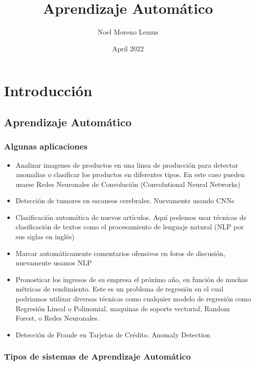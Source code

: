\documentclass[10pt,a4paper]{book}
\title{Aprendizaje Autom\'atico}
\author{Noel Moreno Lemus}
\date{April 2022 }
\begin{document}
\maketitle
  
\tableofcontents

\part{Introducci\'on}

\chapter{Aprendizaje Autom\'atico}

\section{Algunas aplicaciones}
\begin{itemize}
\item Analizar imagenes de productos en una linea de producci\'on para detectar anomalias o clasificar los productos en diferentes tipos.  En este caso pueden usarse Redes Neuronales de Convoluci\'on (Convolutional Neural Networks)
\item Detecci\'on de tumores en escaneos cerebrales.  Nuevamente usando CNNs
\item Clasificaci\'on autom\'atica de nuevos art\'iculos. Aqu\'i podemos usar t\'ecnicas de clasificaci\'on de textos como el procesamiento de lenguaje natural (NLP por sus siglas en ingl\'es)
\item Marcar automáticamente comentarios ofensivos en foros de discusión,  nuevamente usamos NLP
\item Pronosticar los ingresos de su empresa el próximo año, en función de muchas métricas de rendimiento.  Este es un problema de regresi\'on en el cual podriamos utilizar diversas t\'ecnicas como cualquier modelo de regresi\'on como Regresi\'on Lineal o Polinomial,  maquinas de soporte vectorial,  Random Forest,  o Redes Neuronales.
\item Detecci\'on de Fraude en Tarjetas de Cr\'edito. Anomaly Detection
\end{itemize}

\section{Tipos de sistemas de Aprendizaje Autom\'atico}
\end{document}
